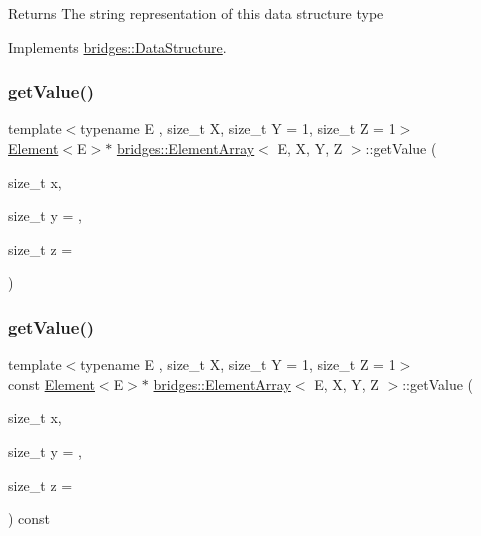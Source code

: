 \begin{DoxyReturn}{Returns}
The string representation of this data structure type 
\end{DoxyReturn}


Implements \hyperlink{classbridges_1_1_data_structure_a957a63b106e340bc753620c650632bdc}{bridges\+::\+Data\+Structure}.

\hypertarget{classbridges_1_1_element_array_a45bac55f6f64a90eb61fd3faaf1aaffe}{}\label{classbridges_1_1_element_array_a45bac55f6f64a90eb61fd3faaf1aaffe} 
\subsubsection{\texorpdfstring{get\+Value()}{getValue()}\hspace{0.1cm}{\footnotesize\ttfamily [1/2]}}
{\footnotesize\ttfamily template$<$typename E , size\+\_\+t X, size\+\_\+t Y = 1, size\+\_\+t Z = 1$>$ \\
\hyperlink{classbridges_1_1_element}{Element}$<$E$>$$\ast$ \hyperlink{classbridges_1_1_element_array}{bridges\+::\+Element\+Array}$<$ E, X, Y, Z $>$\+::get\+Value (\begin{DoxyParamCaption}\item[{size\+\_\+t}]{x,  }\item[{size\+\_\+t}]{y = {},  }\item[{size\+\_\+t}]{z = {} }\end{DoxyParamCaption})\hspace{0.3cm}{\ttfamily [inline]}}

\hypertarget{classbridges_1_1_element_array_a9e15557584b74ac7909cac00a2ab4fbe}{}\label{classbridges_1_1_element_array_a9e15557584b74ac7909cac00a2ab4fbe} 
\subsubsection{\texorpdfstring{get\+Value()}{getValue()}\hspace{0.1cm}{\footnotesize\ttfamily [2/2]}}
{\footnotesize\ttfamily template$<$typename E , size\+\_\+t X, size\+\_\+t Y = 1, size\+\_\+t Z = 1$>$ \\
const \hyperlink{classbridges_1_1_element}{Element}$<$E$>$$\ast$ \hyperlink{classbridges_1_1_element_array}{bridges\+::\+Element\+Array}$<$ E, X, Y, Z $>$\+::get\+Value (\begin{DoxyParamCaption}\item[{size\+\_\+t}]{x,  }\item[{size\+\_\+t}]{y = {},  }\item[{size\+\_\+t}]{z = {} }\end{DoxyParamCaption}) const\hspace{0.3cm}{\ttfamily [inline]}}

